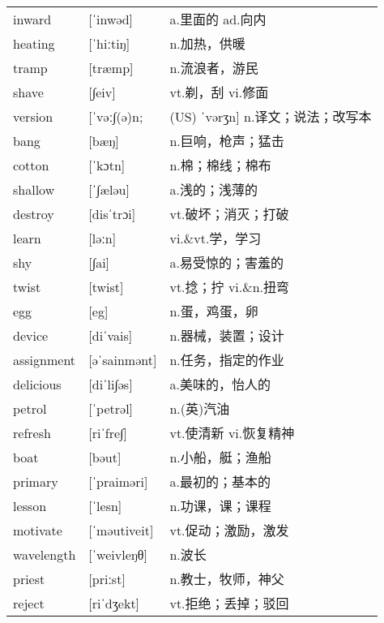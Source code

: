 \documentclass[a4paper]{article}
\begin{document}
\section{}
\begin{tabular}{l l l}

inward & [ˈinwəd] & a.里面的 ad.向内 \\
heating & [ˈhiːtiŋ] & n.加热，供暖 \\
tramp & [træmp] & n.流浪者，游民 \\
shave & [∫eiv] & vt.剃，刮 vi.修面 \\
version & [ˈvəː∫(ə)n; & (US) ˈvərʒn] n.译文；说法；改写本 \\
bang & [bæŋ] & n.巨响，枪声；猛击 \\
cotton & [ˈkɔtn] & n.棉；棉线；棉布 \\
shallow & [ˈ∫æləu] & a.浅的；浅薄的 \\
destroy & [disˈtrɔi] & vt.破坏；消灭；打破 \\
learn & [ləːn] & vi.\&vt.学，学习 \\
shy & [∫ai] & a.易受惊的；害羞的 \\
twist & [twist] & vt.捻；拧 vi.\&n.扭弯 \\
egg & [eg] & n.蛋，鸡蛋，卵 \\
device & [diˈvais] & n.器械，装置；设计 \\
assignment & [əˈsainmənt] & n.任务，指定的作业 \\
delicious & [diˈli∫əs] & a.美味的，怡人的 \\
petrol & [ˈpetrəl] & n.(英)汽油 \\
refresh & [riˈfre∫] & vt.使清新 vi.恢复精神 \\
boat & [bəut] & n.小船，艇；渔船 \\
primary & [ˈpraiməri] & a.最初的；基本的 \\
lesson & [ˈlesn] & n.功课，课；课程 \\
motivate & [ˈməutiveit] & vt.促动；激励，激发 \\
wavelength & [ˈweivleŋθ] & n.波长 \\
priest & [priːst] & n.教士，牧师，神父 \\
reject & [riˈdʒekt] & vt.拒绝；丢掉；驳回 \\

\end{tabular}
\end{document}
